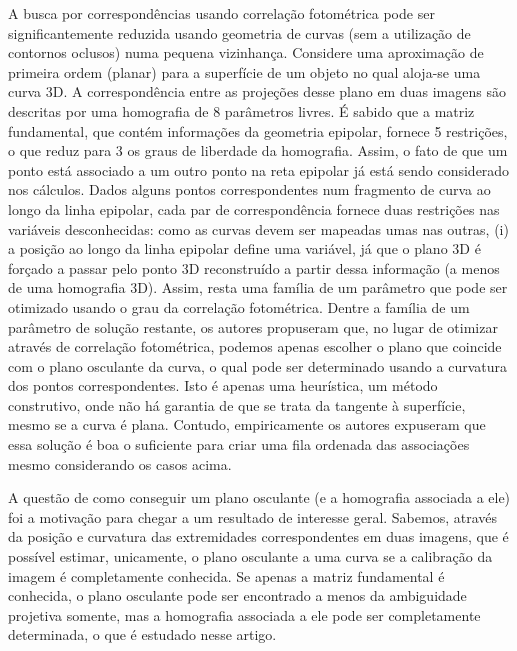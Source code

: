 A busca por correspondências usando correlação fotométrica pode ser significantemente reduzida usando geometria de curvas (sem a utilização de contornos oclusos) numa pequena vizinhança. Considere uma aproximação de primeira ordem (planar) para a superfície de um objeto no qual aloja-se uma curva 3D. A correspondência entre as projeções desse plano em duas imagens são descritas por uma homografia de 8 parâmetros livres. É sabido que a matriz fundamental, que contém informações da geometria epipolar, fornece 5 restrições, o que reduz para 3 os graus de liberdade da homografia. Assim, o fato de que um ponto está associado a um outro ponto na reta epipolar já está sendo considerado nos cálculos. Dados alguns pontos correspondentes num fragmento de curva ao longo da linha epipolar, cada par de correspondência fornece duas restrições nas variáveis desconhecidas: como as curvas devem ser mapeadas umas nas outras, (i) a posição ao longo da linha epipolar define uma variável, já que o plano 3D é forçado a passar pelo ponto 3D reconstruído a partir dessa informação (a menos de uma homografia 3D). Assim, resta uma família de um parâmetro que pode ser otimizado usando o grau da correlação fotométrica. Dentre a família de um parâmetro de solução restante, os autores propuseram que, no lugar de otimizar através de correlação fotométrica, podemos apenas escolher o plano que coincide com o plano osculante da curva, o qual pode ser determinado usando a curvatura dos pontos correspondentes. Isto é apenas uma heurística, um método construtivo, onde não há garantia de que se trata da tangente à superfície, mesmo se a curva é plana. Contudo, empiricamente os autores expuseram que essa solução é boa o suficiente para criar uma fila ordenada das associações mesmo considerando os casos acima.

A questão de como conseguir um plano osculante (e a homografia associada a ele) foi a motivação para chegar a um resultado de interesse geral. Sabemos, através da posição e curvatura das extremidades correspondentes em duas imagens, que é possível estimar, unicamente, o plano osculante a uma curva se a calibração da imagem é completamente conhecida. Se apenas a matriz fundamental é conhecida, o plano osculante pode ser encontrado a menos da ambiguidade projetiva somente, mas a homografia associada a ele pode ser completamente determinada, o que é estudado nesse artigo.


